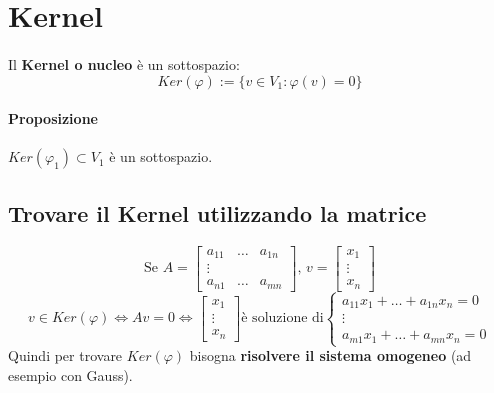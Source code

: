 \documentclass[a4paper, 12pt]{report}
\begin{document}
        \section{Kernel}
            \paragraph{}Il \textbf{Kernel o nucleo} è un sottospazio:    
            $$Ker(\varphi):= \{v \in V_1 : \varphi(v)=0\}$$
            \paragraph{Proposizione}$Ker(\varphi_1) \subset V_1$ è un sottospazio.
            \subsection{Trovare il Kernel utilizzando la matrice}
            $$
            \text{Se } A=
            \begin{bmatrix}
                a_{11} & \dots & a_{1n}\\
                \vdots\\
                a_{n1} & \dots & a_{mn}
            \end{bmatrix}
            \text{, } v=
            \begin{bmatrix}
                x_1\\
                \vdots\\
                x_n
            \end{bmatrix}
            $$
            $$
            v \in Ker(\varphi) \Leftrightarrow Av=0 \Leftrightarrow 
            \begin{bmatrix}
                x_1\\
                \vdots\\
                x_n
            \end{bmatrix}
            \text{è soluzione di}
            \begin{cases}
                a_{11}x_1+\dots+a_{1n}x_n=0\\
                \vdots\\
                a_{m1}x_1+\dots+a_{mn}x_n=0
            \end{cases}
            $$
            Quindi per trovare $Ker(\varphi)$ bisogna \textbf{risolvere il sistema omogeneo} (ad esempio con Gauss).
\end{document}
